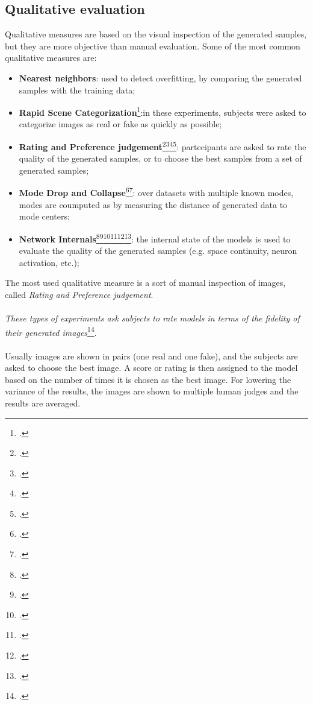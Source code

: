 \subsection{Qualitative evaluation}
\label{subsec:qualitative-evaluation}
Qualitative measures are based on the visual inspection of the generated samples, but they are more objective than manual evaluation.
Some of the most common qualitative measures are:
\begin{itemize}
    \item \textbf{Nearest neighbors}: used to detect overfitting, by comparing the generated samples with the training data;
    \item \textbf{Rapid Scene Categorization}\footcite{paper:rapidscenecat}:in these experiments, subjects were asked to categorize images as real or fake as quickly as possible;
    \item \textbf{Rating and Preference judgement}\footcite{paper:stackadvnet}\footcite{paper:stackadvnet1}\footcite{paper:stackadvnet2}\footcite{paper:stackadvnet3}: 
    partecipants are asked to rate the quality of the generated samples, or to choose the best samples from a set of generated samples;
    \item \textbf{Mode Drop and Collapse}\footcite{paper:dropandcollapse}\footcite{paper:dropandcollapse2}: over datasets with multiple known modes, modes are coumputed as by measuring the distance of generated data to mode centers;
    \item \textbf{Network Internals}\footcite{paper:netint}\footcite{paper:netint1}\footcite{paper:netint2}\footcite{paper:netint3}\footcite{paper:netint4}\footcite{paper:netint5}: 
    the internal state of the models is used to evaluate the quality of the generated samples (e.g. space continuity, neuron activation, etc.);
\end{itemize}
The most used qualitative measure is a sort of manual inspection of images, called \emph{Rating and Preference judgement}.\\\\
\emph{These types of experiments ask subjects to rate models in terms of the fidelity of their generated images}\footcite{paper:ganeval}.\\\\
Usually images are shown in pairs (one real and one fake), and the subjects are asked to choose the best image.
A score or rating is then assigned to the model based on the number of times it is chosen as the best image.
For lowering the variance of the results, the images are shown to multiple human judges and the results are averaged.
